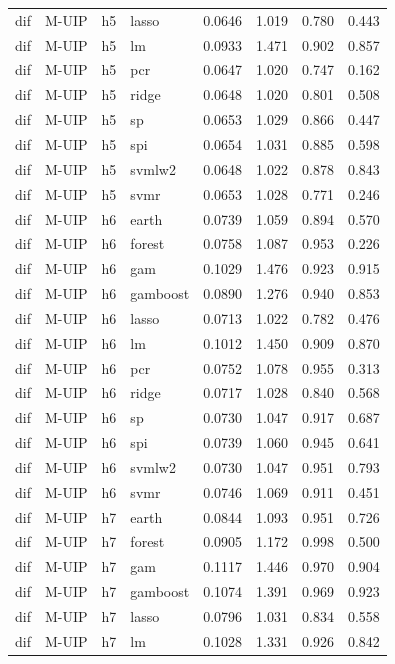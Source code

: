 \begin{ThreePartTable}
\begin{longtable}[t]{llclcccc}
dif & M-UIP & h5 & lasso & 0.0646 & 1.019 & 0.780 & 0.443\\
dif & M-UIP & h5 & lm & 0.0933 & 1.471 & 0.902 & 0.857\\
dif & M-UIP & h5 & pcr & 0.0647 & 1.020 & 0.747 & 0.162\\
dif & M-UIP & h5 & ridge & 0.0648 & 1.020 & 0.801 & 0.508\\
dif & M-UIP & h5 & sp & 0.0653 & 1.029 & 0.866 & 0.447\\
dif & M-UIP & h5 & spi & 0.0654 & 1.031 & 0.885 & 0.598\\
dif & M-UIP & h5 & svmlw2 & 0.0648 & 1.022 & 0.878 & 0.843\\
dif & M-UIP & h5 & svmr & 0.0653 & 1.028 & 0.771 & 0.246\\
\addlinespace
dif & M-UIP & h6 & earth & 0.0739 & 1.059 & 0.894 & 0.570\\
dif & M-UIP & h6 & forest & 0.0758 & 1.087 & 0.953 & 0.226\\
dif & M-UIP & h6 & gam & 0.1029 & 1.476 & 0.923 & 0.915\\
dif & M-UIP & h6 & gamboost & 0.0890 & 1.276 & 0.940 & 0.853\\
dif & M-UIP & h6 & lasso & 0.0713 & 1.022 & 0.782 & 0.476\\
dif & M-UIP & h6 & lm & 0.1012 & 1.450 & 0.909 & 0.870\\
dif & M-UIP & h6 & pcr & 0.0752 & 1.078 & 0.955 & 0.313\\
dif & M-UIP & h6 & ridge & 0.0717 & 1.028 & 0.840 & 0.568\\
dif & M-UIP & h6 & sp & 0.0730 & 1.047 & 0.917 & 0.687\\
dif & M-UIP & h6 & spi & 0.0739 & 1.060 & 0.945 & 0.641\\
dif & M-UIP & h6 & svmlw2 & 0.0730 & 1.047 & 0.951 & 0.793\\
dif & M-UIP & h6 & svmr & 0.0746 & 1.069 & 0.911 & 0.451\\
\addlinespace
dif & M-UIP & h7 & earth & 0.0844 & 1.093 & 0.951 & 0.726\\
dif & M-UIP & h7 & forest & 0.0905 & 1.172 & 0.998 & 0.500\\
dif & M-UIP & h7 & gam & 0.1117 & 1.446 & 0.970 & 0.904\\
dif & M-UIP & h7 & gamboost & 0.1074 & 1.391 & 0.969 & 0.923\\
dif & M-UIP & h7 & lasso & 0.0796 & 1.031 & 0.834 & 0.558\\
dif & M-UIP & h7 & lm & 0.1028 & 1.331 & 0.926 & 0.842\\

\end{longtable}
\end{ThreePartTable}
